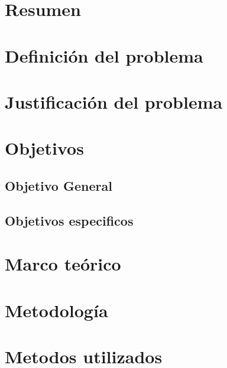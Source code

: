 \documentclass[letter,openright,12pt]{book}
\begin{document}
  \newpage
  \mbox{}
  \thispagestyle{empty} %
  
  
  \chapter*{Resumen} %
  
  \tableofcontents %

  \cleardoublepage
  \listoffigures %

  \cleardoublepage
  \listoftables %
  
  \chapter{Definición del problema}
  
  \chapter{Justificación del problema}
  
  \chapter{Objetivos}
  \section{Objetivo General}
  \section{Objetivos especificos}
  
  \chapter{Marco teórico}
  
  \chapter{Metodología}
  
  \chapter{Metodos utilizados}
  
\end{document}
